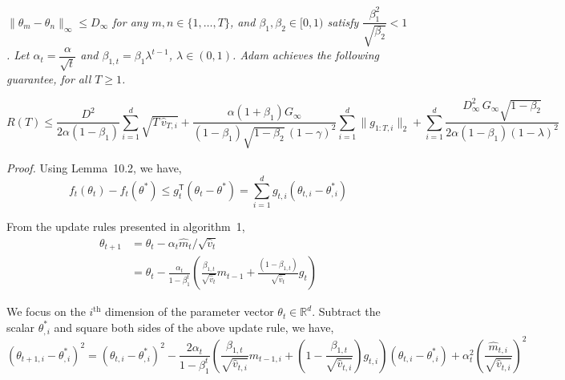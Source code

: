 \documentclass[11pt]{article}
\begin{document}
\noindent
\emph{$\|\theta_m - \theta_n\|_\infty \leq D_\infty$ for any
$m, n \in \{1, \ldots, T\}$, and $\beta_1, \beta_2 \in [0, 1)$
satisfy $\dfrac{\beta_1^2}{\sqrt{\beta_2}} < 1$. Let
$\alpha_t = \dfrac{\alpha}{\sqrt{t}}$ and
$\beta_{1,t} = \beta_1 \lambda^{t-1}$, $\lambda \in (0, 1)$.
Adam achieves the following guarantee, for all $T \geq 1$.}

\[
R(T) \leq \frac{D^2}{2\alpha(1 - \beta_1)}
          \sum_{i=1}^{d} \sqrt{T\,\widehat{v}_{T,i}}
        + \frac{\alpha(1 + \beta_1) G_\infty}
               {(1 - \beta_1)\sqrt{1 - \beta_2}\,(1 - \gamma)^2}
          \sum_{i=1}^{d} \|g_{1:T,i}\|_2
        + \sum_{i=1}^{d}
          \frac{D_\infty^2\, G_\infty \sqrt{1 - \beta_2}}
               {2\alpha(1 - \beta_1)(1 - \lambda)^2}
\]

\noindent\emph{Proof.} Using Lemma~10.2, we have,
\[
f_t(\theta_t) - f_t(\theta^*)
 \leq g_t^\mathsf{T}(\theta_t - \theta^*)
 = \sum_{i=1}^{d} g_{t,i}(\theta_{t,i} - \theta^*_{,i})
\]

\noindent
From the update rules presented in algorithm~1,
\begin{align*}
\theta_{t+1} &= \theta_t - \alpha_t \widehat{m}_t / \sqrt{\widehat{v}_t} \\
             &= \theta_t - \frac{\alpha_t}{1 - \beta_1^t}
                \left(\frac{\beta_{1,t}}{\sqrt{\widehat{v}_t}} m_{t-1}
                     + \frac{(1 - \beta_{1,t})}{\sqrt{\widehat{v}_t}} g_t\right)
\end{align*}

\noindent
We focus on the $i^\text{th}$ dimension of the parameter vector
$\theta_t \in \mathbb{R}^d$. Subtract the scalar $\theta^*_{,i}$
and square both sides of the above update rule, we have,
\[
(\theta_{t+1,i} - \theta^*_{,i})^2
 = (\theta_{t,i} - \theta^*_{,i})^2
 - \frac{2\alpha_t}{1 - \beta_1^t}\!\left(\frac{\beta_{1,t}}{\sqrt{\widehat{v}_{t,i}}} m_{t-1,i}
   + \left(1 - \frac{\beta_{1,t}}{\sqrt{\widehat{v}_{t,i}}}\right) g_{t,i}\right)\!(\theta_{t,i} - \theta^*_{,i})
 + \alpha_t^2\!\left(\frac{\widehat{m}_{t,i}}{\sqrt{\widehat{v}_{t,i}}}\right)^{\!2}
\]
\end{document}
